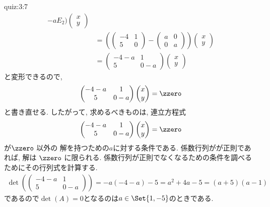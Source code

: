\begin{answerof}{quiz:3:7}
\begin{align*}
        -
        aE_2)\begin{pmatrix}x\\y\end{pmatrix}\\
        &=
        (\begin{pmatrix}-4&1\\5&0\end{pmatrix}
        -
        \begin{pmatrix}a&0\\0&a\end{pmatrix}
          )\begin{pmatrix}x\\y\end{pmatrix}\\
        &=
        \begin{pmatrix}-4-a&1\\5&0-a\end{pmatrix}
          \begin{pmatrix}x\\y\end{pmatrix}        
  \end{align*}
  と変形できるので,
  \begin{align*}
    \begin{pmatrix}-4-a&1\\5&0-a\end{pmatrix}
    \begin{pmatrix}x\\y\end{pmatrix}
      =
      \zzero
  \end{align*}
  と書き直せる.
  したがって,
  求めるべきものは,
  連立方程式
  \begin{align*}
    \begin{pmatrix}-4-a&1\\5&0-a\end{pmatrix}
    \begin{pmatrix}x\\y\end{pmatrix}
      =
      \zzero
  \end{align*}
  が$\zzero$
  以外の
  解を持つための$a$に対する条件である.
  係数行列がが正則であれば,
  解は
  $\zzero$
  に限られる.
  係数行列が正則でなくなるための条件を調べるためにその行列式を計算する.
  \begin{align*}
    \det(\begin{pmatrix}-4-a&1\\5&0-a\end{pmatrix})
     =-a(-4-a)-5=a^2+4a-5=(a+5)(a-1)
  \end{align*}
  であるので$\det(A)=0$となるのは$a\in\Set{1,-5}$のときである.


\end{answerof}
